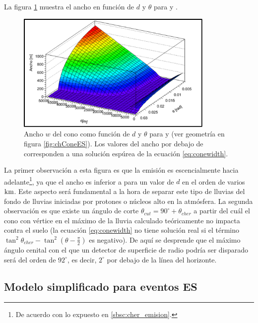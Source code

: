 	La figura \ref{fig:chConeWidth} muestra el ancho en función de $d$ y $\theta$ para  y .
	\begin{figure}[ht!]
	\centering
		\includegraphics[width=0.85\textwidth]{fig/EASRadio/anchoLluvia}
		\caption{\label{fig:chConeWidth} Ancho $w$ del cono \cher{} como función de $d$ y $\theta$ para  y  (ver geometr\'ia en figura \ref{fig:chConeES}). Los valores del ancho por debajo de  corresponden a una solución espúrea de la ecuación \ref{eq:conewidth}.}
	\end{figure}
	La primer observación a esta figura es que la emisión es escencialmente hacia adelante\footnote{De acuerdo con lo expuesto en \ref{sbsc:cher_emision}.}, ya que el ancho es inferior a  para un valor de $d$ en el orden de varios $\rm km$.
	Este aspecto será fundamental a la hora de separar este tipo de lluvias del fondo de lluvias iniciadas por protones o núcleos alto en la atmósfera.
	La segunda observación es que existe un ángulo de corte $\theta_{cut}=90^\circ+\theta_{cher}$ a partir del cuál el cono \cher{} con v\'ertice en el m\'aximo de la lluvia calculado teóricamente no impacta contra el suelo (la ecuación \ref{eq:conewidth} no tiene solución real si el término $\tan^2 \theta_{cher}-\tan^2 (\theta-\frac{\pi}{2})$ es negativo).
	De aquí se desprende que el máximo ángulo cenital con el que un detector de superficie de radio podría ser disparado será del orden de $92^\circ$, es decir, $2^\circ$ por debajo de la l\'inea del horizonte.
	
	\subsection{Modelo simplificado para eventos ES}
	\label{sc:toymodelES}

